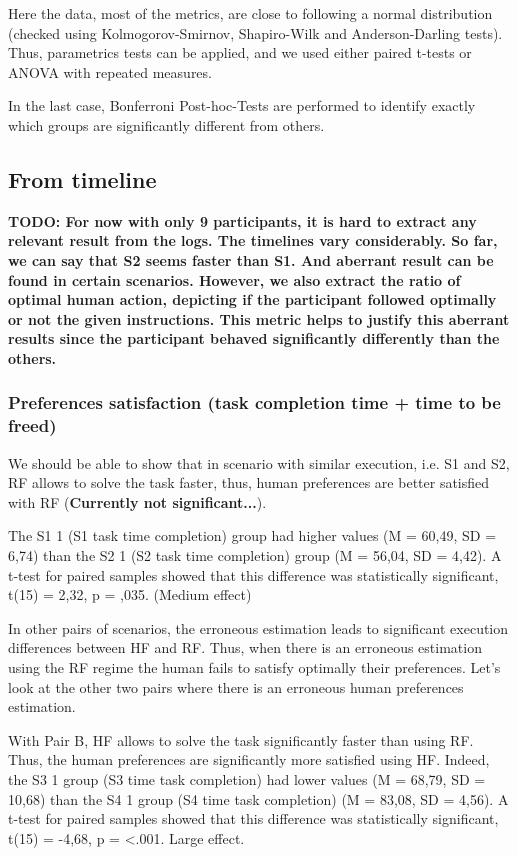 Here the data, most of the metrics, are close to following a normal distribution (checked using Kolmogorov-Smirnov, Shapiro-Wilk and Anderson-Darling tests). Thus, parametrics tests can be applied, and we used either paired t-tests or ANOVA with repeated measures.

In the last case, Bonferroni Post-hoc-Tests are performed to identify exactly which groups are significantly different from others.



\subsection{From timeline}
\textbf{TODO: For now with only 9 participants, it is hard to extract any relevant result from the logs. The timelines vary considerably. So far, we can say that S2 seems faster than S1. And aberrant result can be found in certain scenarios. However, we also extract the ratio of optimal human action, depicting if the participant followed optimally or not the given instructions. This metric helps to justify this aberrant results since the participant behaved significantly differently than the others.}

\subsubsection*{Preferences satisfaction (task completion time + time to be freed)}
We should be able to show that in scenario with similar execution, i.e. S1 and S2, RF allows to solve the task faster, thus, human preferences are better satisfied with RF (\textbf{Currently not significant...}).

The S1 1 (S1 task time completion) group had higher values (M = 60,49, SD = 6,74) than the S2 1 (S2 task time completion) group (M = 56,04, SD = 4,42). A t-test for paired samples showed that this difference was statistically significant, t(15) = 2,32, p = ,035. (Medium effect)

In other pairs of scenarios, the erroneous estimation leads to significant execution differences between HF and RF. Thus, when there is an erroneous estimation using the RF regime the human fails to satisfy optimally their preferences. Let's look at the other two pairs where there is an erroneous human preferences estimation. 

With Pair B, HF allows to solve the task significantly faster than using RF. Thus, the human preferences are significantly more satisfied using HF.   
Indeed, the S3 1 group (S3 time task completion) had lower values (M = 68,79, SD = 10,68) than the S4 1 group (S4 time task completion) (M = 83,08, SD = 4,56). A t-test for paired samples showed that this difference was statistically significant, t(15) = -4,68, p = <.001. Large effect.

